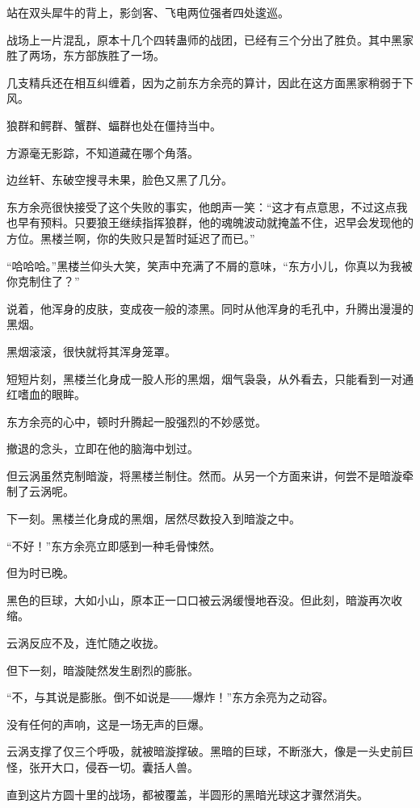 
\begin{this_body}

站在双头犀牛的背上，影剑客、飞电两位强者四处逡巡。

战场上一片混乱，原本十几个四转蛊师的战团，已经有三个分出了胜负。其中黑家胜了两场，东方部族胜了一场。

几支精兵还在相互纠缠着，因为之前东方余亮的算计，因此在这方面黑家稍弱于下风。

狼群和鳄群、蟹群、蝠群也处在僵持当中。

方源毫无影踪，不知道藏在哪个角落。

边丝轩、东破空搜寻未果，脸色又黑了几分。

东方余亮很快接受了这个失败的事实，他朗声一笑：“这才有点意思，不过这点我也早有预料。只要狼王继续指挥狼群，他的魂魄波动就掩盖不住，迟早会发现他的方位。黑楼兰啊，你的失败只是暂时延迟了而已。”

“哈哈哈。”黑楼兰仰头大笑，笑声中充满了不屑的意味，“东方小儿，你真以为我被你克制住了？”

说着，他浑身的皮肤，变成夜一般的漆黑。同时从他浑身的毛孔中，升腾出漫漫的黑烟。

黑烟滚滚，很快就将其浑身笼罩。

短短片刻，黑楼兰化身成一股人形的黑烟，烟气袅袅，从外看去，只能看到一对通红嗜血的眼眸。

东方余亮的心中，顿时升腾起一股强烈的不妙感觉。

撤退的念头，立即在他的脑海中划过。

但云涡虽然克制暗漩，将黑楼兰制住。然而。从另一个方面来讲，何尝不是暗漩牵制了云涡呢。

下一刻。黑楼兰化身成的黑烟，居然尽数投入到暗漩之中。

“不好！”东方余亮立即感到一种毛骨悚然。

但为时已晚。

黑色的巨球，大如小山，原本正一口口被云涡缓慢地吞没。但此刻，暗漩再次收缩。

云涡反应不及，连忙随之收拢。

但下一刻，暗漩陡然发生剧烈的膨胀。

“不，与其说是膨胀。倒不如说是――爆炸！”东方余亮为之动容。

没有任何的声响，这是一场无声的巨爆。

云涡支撑了仅三个呼吸，就被暗漩撑破。黑暗的巨球，不断涨大，像是一头史前巨怪，张开大口，侵吞一切。囊括人兽。

直到这片方圆十里的战场，都被覆盖，半圆形的黑暗光球这才骤然消失。


\end{this_body}
